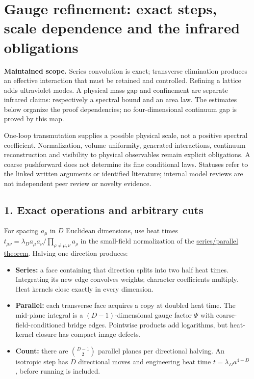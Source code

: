 \documentclass[11pt,a4paper]{article}
\newcommand{\tightlist}{\setlength{\itemsep}{0pt}\setlength{\parskip}{0pt}}
\begin{document}
\hypertarget{gauge-refinement-exact-steps-scale-dependence-and-the-infrared-obligations}{%
\section{Gauge refinement: exact steps, scale dependence and the
infrared
obligations}\label{gauge-refinement-exact-steps-scale-dependence-and-the-infrared-obligations}}

\textbf{Maintained scope.} Series convolution is exact; transverse
elimination produces an effective interaction that must be retained and
controlled. Refining a lattice adds ultraviolet modes. A physical mass
gap and confinement are separate infrared claims: respectively a
spectral bound and an area law. The estimates below organize the proof
dependencies; no four-dimensional continuum gap is proved by this map.

One-loop transmutation supplies a possible physical scale, not a
positive spectral coefficient. Normalization, volume uniformity,
generated interactions, continuum reconstruction and visibility to
physical observables remain explicit obligations. A coarse pushforward
does not determine its fine conditional laws. Statuses refer to the
linked written arguments or identified literature; internal model
reviews are not independent peer review or novelty evidence.

\hypertarget{exact-operations-and-arbitrary-cuts}{%
\subsection{1. Exact operations and arbitrary
cuts}\label{exact-operations-and-arbitrary-cuts}}

For spacing \(a_\mu\) in \(D\) Euclidean dimensions, use heat times
\(t_{\mu\nu}=\lambda_Da_\mu a_\nu/\prod_{\rho\ne\mu,\nu}a_\rho\) in the
small-field normalization of the
\href{series-parallel-gauge-refinement.md}{series/parallel theorem}.
Halving one direction produces:

\begin{itemize}
\tightlist
\item
  \textbf{Series:} a face containing that direction splits into two half
  heat times. Integrating its new edge convolves weights; character
  coefficients multiply. Heat kernels close exactly in every dimension.
\item
  \textbf{Parallel:} each transverse face acquires a copy at doubled
  heat time. The mid-plane integral is a \((D-1)\)-dimensional gauge
  factor \(\Psi\) with coarse-field-conditioned bridge edges. Pointwise
  products add logarithms, but heat-kernel closure has compact image
  defects.
\item
  \textbf{Count:} there are \(\binom{D-1}{2}\) parallel planes per
  directional halving. An isotropic step has \(D\) directional moves and
  engineering heat time \(t=\lambda_Da^{4-D}\), before running is
  included.
\end{itemize}
\end{document}
